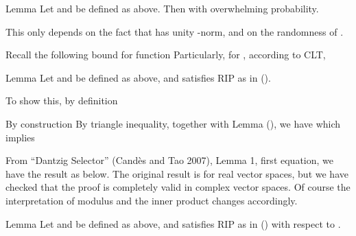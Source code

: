 \Result
{Lemma}
{
Let  and  be defined as above.
Then
with overwhelming probability.
}

This only depends on the fact that  has unity -norm, and on the randomness of .

Recall the following bound for  function
Particularly, for , according to CLT,

\color[red]{(To be done)}

\Result
{Lemma}
{
Let  and  be defined as above, and  satisfies RIP as in ().
}

To show this, by definition

By construction
By triangle inequality, together with Lemma (), we have
which implies

From ``Dantzig Selector'' (Cand\`es and Tao 2007), Lemma 1, first equation, we have the result as below.
The original result is for real vector spaces, but we have checked that the proof is completely valid in complex vector spaces.
Of course the interpretation of modulus and the inner product changes accordingly.

\Result
{Lemma}
{
Let  and  be defined as above, and  satisfies RIP as in () with respect to .
}

